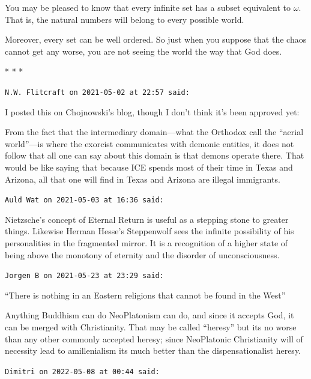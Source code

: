 You may be pleased to know that every infinite set has a subset equivalent to $\omega$. That is, the natural numbers will belong to every possible world.

Moreover, every set can be well ordered. So just when you suppose that the chaos cannot get any worse, you are not seeing the world the way that God does.



\begin{center}* * *\end{center}

\begin{footnotesize}
\begin{sffamily}
\texttt{N.W. Flitcraft on 2021-05-02 at 22:57 said:}

I posted this on Chojnowski's blog, though I don't think it's been approved yet:

From the fact that the intermediary domain---what the Orthodox call the ``aerial world''---is where the exorcist communicates with demonic entities, it does not follow that all one can say about this domain is that demons operate there. That would be like saying that because ICE spends most of their time in Texas and Arizona, all that one will find in Texas and Arizona are illegal immigrants.

\hfill

\texttt{Auld Wat on 2021-05-03 at 16:36 said:}

Nietzsche's concept of Eternal Return is useful as a stepping stone to greater things. Likewise Herman Hesse's Steppenwolf sees the infinite possibility of his personalities in the fragmented mirror. It is a recognition of a higher state of being above the monotony of eternity and the disorder of unconsciousness.

\hfill

\texttt{Jorgen B on 2021-05-23 at 23:29 said:}

``There is nothing in an Eastern religions that cannot be found in the West''

Anything Buddhism can do NeoPlatonism can do, and since it accepts God, it can be merged with Christianity. That may be called ``heresy'' but its no worse than any other commonly accepted heresy; since NeoPlatonic Christianity will of necessity lead to amillenialism its much better than the dispensationalist heresy.

\hfill

\texttt{Dimitri on 2022-05-08 at 00:44 said:}


\end{sffamily}
\end{footnotesize}
